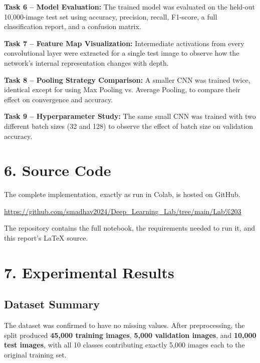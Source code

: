 \documentclass[11pt]{article}
\begin{document}
\textbf{Task 6 -- Model Evaluation:} The trained model was evaluated on the held-out 10,000-image test set using accuracy, precision, recall, F1-score, a full classification report, and a confusion matrix.

\textbf{Task 7 -- Feature Map Visualization:} Intermediate activations from every convolutional layer were extracted for a single test image to observe how the network's internal representation changes with depth.

\textbf{Task 8 -- Pooling Strategy Comparison:} A smaller CNN was trained twice, identical except for using Max Pooling vs. Average Pooling, to compare their effect on convergence and accuracy.

\textbf{Task 9 -- Hyperparameter Study:} The same small CNN was trained with two different batch sizes (32 and 128) to observe the effect of batch size on validation accuracy.


\section*{6. Source Code}

The complete implementation, exactly as run in Colab, is hosted on GitHub.

\begin{center}
\url{https://github.com/smadhav2024/Deep_Learning_Lab/tree/main/Lab%203}
\end{center}

The repository contains the full notebook, the requirements needed to run it, and this report's LaTeX source.


\section*{7. Experimental Results}

\subsection*{Dataset Summary}

The dataset was confirmed to have no missing values. After preprocessing, the split produced \textbf{45,000 training images}, \textbf{5,000 validation images}, and \textbf{10,000 test images}, with all 10 classes contributing exactly 5,000 images each to the original training set.
\end{document}
